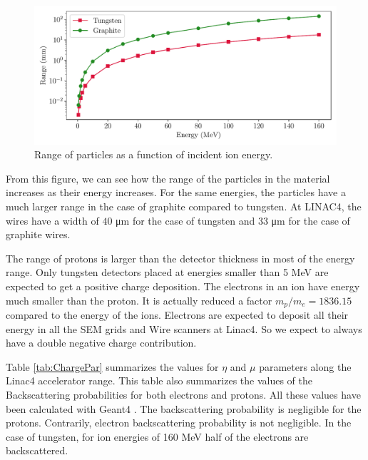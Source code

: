 \begin{figure}[h]
    \centering
    \includegraphics[width=0.9\columnwidth]{RangePlotLinac4/RangeL4.pdf}
    \caption{Range of particles as a function of incident ion energy.}
    \label{fig:RangeLinac4}
\end{figure}

From this figure, we can see how the range of the particles in the material increases as their energy increases. For the same energies, the particles have a much larger range in the case of graphite compared to tungsten. At LINAC4, the wires have a width of $40$ \si{\micro\metre} for the case of tungsten and 33 \si{\micro \metre} for the case of graphite wires. 

The range of protons is larger than the detector thickness in most of the energy range. Only tungsten detectors placed at energies smaller than 5  \si[]{\mega\electronvolt} are expected to get a positive charge deposition. The electrons in an \hm ion have energy much smaller than the proton. It is actually reduced a factor $m_p / m_e = 1836.15$ compared to the energy of the \hm ions.  Electrons are expected to deposit all their energy in all the SEM grids and Wire scanners at Linac4. So we expect to always have a double negative charge contribution. 

Table \ref{tab:ChargePar} summarizes the values for $\eta$ and $\mu$ parameters along the Linac4 accelerator range. This table also summarizes the values of the Backscattering probabilities for both electrons and protons. All these values have been calculated with Geant4 \parencite[][]{ref:Geant4}. The backscattering probability is negligible for the protons. Contrarily, electron backscattering probability is not negligible. In the case of tungsten, for ion energies of 160 MeV half of the electrons are backscattered.

